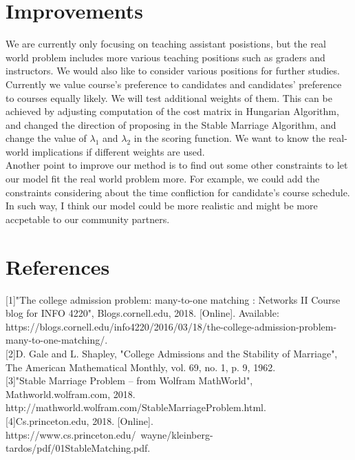 \documentclass[twoside,twocolumn]{article}
\begin{document}
    \section{Improvements}
    We are currently only focusing on teaching assistant posistions, but the real world problem includes more various teaching
    positions such as graders and instructors. We would also like to consider various positions for further studies.
    \\ \indent Currently we value course's preference to candidates and candidates' preference to courses equally likely. We will
    test additional weights of them. This can be achieved by adjusting computation of the cost matrix in Hungarian Algorithm, and
    changed the direction of proposing in the Stable Marriage Algorithm, and change the value of $\lambda_1$ and $\lambda_2$ in the
    scoring function. We want to know the real-world implications if different weights are used.
    \\ \indent Another point to improve our method is to find out some other constraints to let our model fit the real world problem more. For example,
    we could add the constraints considering about the time confliction for candidate's course schedule. 
    \\ \indent In such way, I think our model could be more realistic and might be more accpetable to our community partners.

    \section{References}
    [1]"The college admission problem: many-to-one matching : Networks II Course blog for INFO 4220", Blogs.cornell.edu, 2018. [Online]. 
    Available: https://blogs.cornell.edu/info4220/2016/03/18/the-college-admission-problem-many-to-one-matching/. \\

    [2]D. Gale and L. Shapley, "College Admissions and the Stability of Marriage", The American Mathematical Monthly, vol. 69, no. 1, p. 9, 1962. \\
    
    [3]"Stable Marriage Problem -- from Wolfram MathWorld", Mathworld.wolfram.com, 2018. http://mathworld.wolfram.com/StableMarriageProblem.html. \\
    
    [4]Cs.princeton.edu, 2018. [Online]. https://www.cs.princeton.edu/~wayne/kleinberg-tardos/pdf/01StableMatching.pdf. \\
    
\end{document}
